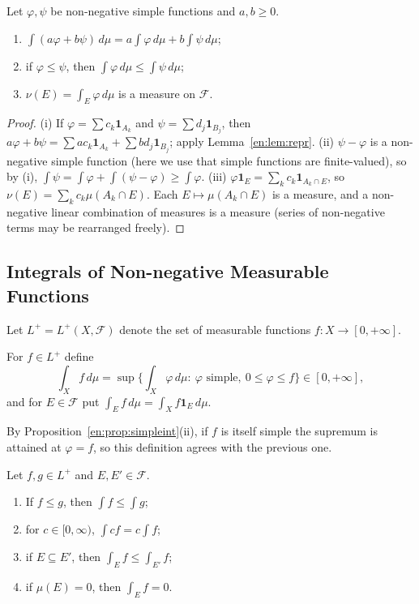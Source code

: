 \documentclass[11pt]{article}
\makeatletter
\newcommand{\envlabel}[1]{\protected@edef\@currentlabel{\themathenv}\label{#1}}
\makeatother
\begin{document}
\begin{proposition}\envlabel{en:prop:simpleint}
Let $\varphi,\psi$ be non-negative simple functions and $a,b\geq0$.
\begin{enumerate}
  \item $\int(a\varphi+b\psi)\,d\mu=a\int\varphi\,d\mu+b\int\psi\,d\mu$;
  \item if $\varphi\leq\psi$, then $\int\varphi\,d\mu\leq\int\psi\,d\mu$;
  \item $\nu(E)=\int_{E}\varphi\,d\mu$ is a measure on $\mathcal{F}$.
\end{enumerate}
\end{proposition}

\begin{proof}
(i) If $\varphi=\sum c_{k}\mathbf{1}_{A_{k}}$ and $\psi=\sum d_{j}\mathbf{1}_{B_{j}}$, then $a\varphi+b\psi=\sum ac_{k}\mathbf{1}_{A_{k}}+\sum bd_{j}\mathbf{1}_{B_{j}}$; apply Lemma~\ref{en:lem:repr}. (ii) $\psi-\varphi$ is a non-negative simple function (here we use that simple functions are finite-valued), so by (i), $\int\psi=\int\varphi+\int(\psi-\varphi)\geq\int\varphi$. (iii) $\varphi\mathbf{1}_{E}=\sum_{k}c_{k}\mathbf{1}_{A_{k}\cap E}$, so $\nu(E)=\sum_{k}c_{k}\mu(A_{k}\cap E)$. Each $E\mapsto\mu(A_{k}\cap E)$ is a measure, and a non-negative linear combination of measures is a measure (series of non-negative terms may be rearranged freely).
\end{proof}

\subsection{Integrals of Non-negative Measurable Functions}

Let $L^{+}=L^{+}(X,\mathcal{F})$ denote the set of measurable functions $f:X\to[0,+\infty]$.

\begin{definition}
For $f\in L^{+}$ define
\[
\int_{X}f\,d\mu=\sup\Big\{\int_{X}\varphi\,d\mu:\ \varphi\text{ simple},\ 0\leq\varphi\leq f\Big\}\in[0,+\infty],
\]
and for $E\in\mathcal{F}$ put $\int_{E}f\,d\mu=\int_{X}f\mathbf{1}_{E}\,d\mu$.
\end{definition}

By Proposition~\ref{en:prop:simpleint}(ii), if $f$ is itself simple the supremum is attained at $\varphi=f$, so this definition agrees with the previous one.

\begin{proposition}\envlabel{en:prop:posbasic}
Let $f,g\in L^{+}$ and $E,E'\in\mathcal{F}$.
\begin{enumerate}
  \item If $f\leq g$, then $\int f\leq\int g$;
  \item for $c\in[0,\infty)$, $\int cf=c\int f$;
  \item if $E\subseteq E'$, then $\int_{E}f\leq\int_{E'}f$;
  \item if $\mu(E)=0$, then $\int_{E}f=0$.
\end{enumerate}
\end{proposition}
\end{document}
